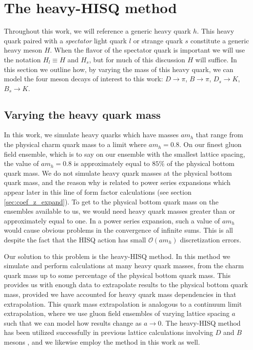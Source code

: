 \section{The heavy-HISQ method}\label{sec:heavy-hisq}
Throughout this work, we will reference a generic heavy quark $h$.  This heavy quark  paired with a \textit{spectator} light quark $l$ or strange quark $s$ constitute a generic heavy meson $H$.  When the flavor of the spectator quark is important we will use the notation $H_l \equiv H$ and $H_s$, but for much of this discussion $H$ will suffice.  In this section we outline how, by varying the mass of this heavy quark, we can model the four meson decays of interest to this work: $D\rightarrow\pi$, $B\rightarrow \pi$, $D_s\rightarrow K$, $B_s\rightarrow K$.

\subsection{Varying the heavy quark mass}
In this work, we simulate heavy quarks which have masses $am_h$ that range from the physical charm quark mass to a limit where $am_h = 0.8$.  On our finest gluon field ensemble, which is to say on our ensemble with the smallest lattice spacing, the value of $am_h = 0.8$ is approximately equal to $85\%$ of the physical bottom quark mass.  We do not simulate heavy quark masses at the physical bottom quark mass, and the reason why is related to power series expansions which appear later in this line of form factor calculations (see section \ref{sec:coef_z_expand}).  To get to the physical bottom quark mass on the ensembles available to us, we would need heavy quark masses greater than or approximately equal to one.  In a power series expansion, such a value of $am_h$ would cause obvious problems in the convergence of infinite sums.  This is all despite the fact that the HISQ action has small $\mathcal{O}(am_h)$ discretization errors.

Our solution to this problem is the heavy-HISQ method. In this method we simulate and perform calculations at many heavy quark masses, from the charm quark mass up to some percentage of the physical bottom quark mass.  This provides us with enough data to extrapolate results to the physical bottom quark mass, provided we have accounted for heavy quark mass dependencies in that extrapolation.  This quark mass extrapolation is analogous to a continuum limit extrapolation, where we use gluon field ensembles of varying lattice spacing $a$ such that we can model how results change as $a\rightarrow0$. The heavy-HISQ method has been utilized successfully in previous lattice calculations involving $D$ and $B$ mesons \cite{davies_bs_to_ds, Cooper_2020, Harrison_2020, Will_towardsB, Will_technical, harrison2024brightarrowdvector}, and we likewise employ the method in this work as well.

